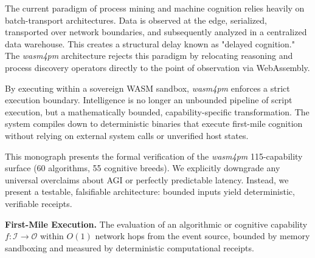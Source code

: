 The current paradigm of process mining and machine cognition relies heavily on batch-transport architectures. Data is observed at the edge, serialized, transported over network boundaries, and subsequently analyzed in a centralized data warehouse. This creates a structural delay known as "delayed cognition." The \textit{wasm4pm} architecture rejects this paradigm by relocating reasoning and process discovery operators directly to the point of observation via WebAssembly. 

By executing within a sovereign WASM sandbox, \textit{wasm4pm} enforces a strict execution boundary. Intelligence is no longer an unbounded pipeline of script execution, but a mathematically bounded, capability-specific transformation. The system compiles down to deterministic binaries that execute first-mile cognition without relying on external system calls or unverified host states.

This monograph presents the formal verification of the \textit{wasm4pm} 115-capability surface (60 algorithms, 55 cognitive breeds). We explicitly downgrade any universal overclaims about AGI or perfectly predictable latency. Instead, we present a testable, falsifiable architecture: bounded inputs yield deterministic, verifiable receipts.

\begin{definition}
\textbf{First-Mile Execution.} The evaluation of an algorithmic or cognitive capability $f: \mathcal{I} \to \mathcal{O}$ within $O(1)$ network hops from the event source, bounded by memory sandboxing and measured by deterministic computational receipts.
\end{definition}
